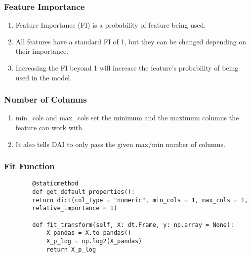 \documentclass[11pt,
               aspectratio=169,
               hyperref={colorlinks}
               ]{beamer}
\begin{document}
	\begin{frame}[fragile]
		\frametitle{Feature Importance}
        \begin{enumerate}
            \item Feature Importance (FI) is a probability of feature being used.
            \item All features have a standard FI of 1, but they can be changed depending on their importance. 
            \item Increasing the FI beyond 1 will increase the feature's probability of being used in the model. 
        \end{enumerate}
\end{frame}
	\begin{frame}[fragile]
        \frametitle{Number of Columns}
        \begin{enumerate}
            \item min\_cols and max\_cols set the minimum and the maximum columns the feature can work with. 
            \item It also tells DAI to only pass the given max/min number of columns.
        \end{enumerate}
\end{frame}
	\begin{frame}[fragile]
		\frametitle{Fit Function}
		\begin{verbatim}
		@staticmethod
		def get_default_properties():
		return dict(col_type = "numeric", min_cols = 1, max_cols = 1,
		relative_importance = 1)

		def fit_transform(self, X: dt.Frame, y: np.array = None):
			X_pandas = X.to_pandas()
			X_p_log = np.log2(X_pandas)
			return X_p_log
		\end{verbatim}
\end{frame}
\end{document}

